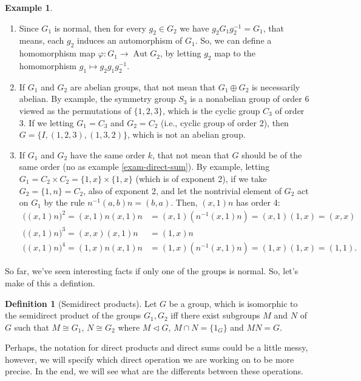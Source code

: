 \documentclass[11pt]{amsbook}%
\newcommand{\ii}{\item}
\theoremstyle{plain}
\theoremstyle{definition}
\newtheorem{definition*}{Definition}
\newtheorem*{example*}{Example}
\numberwithin{equation}{section}
\DeclareMathOperator{\Aut}{Aut}
\begin{document}
\begin{example*}
\begin{enumerate}[1. ]
    \ii Since $G_{1}$ is normal, then for every $g_{2} \in G_{2}$ we have $g_{2}G_{1}g_{2}^{-1} = G_{1}$,
    that means, each $g_{2}$ induces an automorphism of $G_{1}$. So, we can define a
    homomorphism map $\varphi: G_{1} \longrightarrow \Aut G_{2}$, by letting $g_{2}$
    map to the homomorphism $g_{1} \mapsto g_{2}g_{1}g_{2}^{-1}$. \\
    \ii If $G_{1}$ and $G_{2}$ are abelian groups, that not mean that $G_{1} \oplus G_{2}$
    is necessarily abelian. By example, the symmetry group $S_{3}$ is a nonabelian group
    of order 6 viewed as the permutations of $\{1, 2, 3\}$, which is the cyclic group $C_{3}$ of order 3.
    If we letting $G_{1} = C_{3}$ and $G_{2} = C_{2}$ (i.e., cyclic group of order 2), then $G = \{I, (1, 2, 3), (1, 3, 2)\}$, which
    is not an abelian group. \\
    \ii If $G_{1}$ and $G_{2}$ have the same order $k$, that not mean that $G$ should be of the same order (no as example \ref{exam-direct-sum}).
    By example, letting $G_{1} = C_{2} \times C_{2} = \{1, x\} \times \{1, x\}$ (which is of exponent 2), if we take
    $G_{2} = \{1, n\} = C_{2}$, also of exponent 2, and let the nontrivial element
    of $G_{2}$ act on $G_{1}$ by the rule $n^{-1}(a, b)n = (b, a)$. Then, $(x, 1)n$ has order 4: \\
    \begin{align*}
      \bigl((x,1)n\bigr)^2 = (x,1)n(x,1)n &= (x,1)(n^{-1}(x,1)n) = (x,1)(1,x) = (x,x)\\
      \bigl((x,1)n\bigr)^3 = (x,x)(x,1)n &= (1,x)n\\
      \bigl((x,1)n\bigr)^4 = (1,x)n(x,1)n &= (1,x)(n^{-1}(x,1)n) = (1,x)(1,x) = (1,1).
    \end{align*}
\end{enumerate}
So far, we've seen interesting facts if only one of the groups is normal. So, let's make of this
a defintion.
\begin{definition*}[Semidirect products]
  \label{def-semi-product}
  Let $G$ be a group, which is isomorphic to the semidirect product of the groups $G_{1}, G_{2}$ iff
  there exist subgroups $M$ and $N$ of $G$ such that $M \cong G_{1}$, $N \cong G_{2}$ where
  $M \lhd G$, $M \cap N = \{1_{G}\}$ and $MN = G$.
\end{definition*}
Perhaps, the notation for direct products and direct sums could be a little messy,
however, we will specify which direct operation we are working on to be more precise.
In the end, we will see what are the differents between these operations.


\end{example*}
\end{document}
